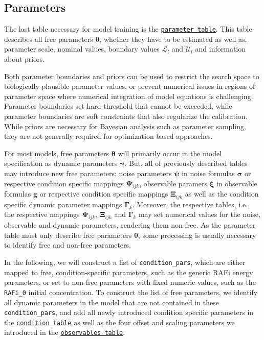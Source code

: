 \documentclass[11pt]{article}
\begin{document}
    \hypertarget{parameters}{%
\subsection{Parameters}\label{parameters}}

The last table necessary for model training is the
\href{https://petab.readthedocs.io/en/latest/documentation_data_format.html\#parameter-table}{\texttt{parameter\ table}}.
This table describes all free parameters \(\boldsymbol{\theta}\),
whether they have to be estimated as well as, parameter scale, nominal
values, boundary values \(\mathcal{L}_l\) and \(\mathcal{U}_l\) and
information about priors.

Both parameter boundaries and priors can be used to restrict the search
space to biologically plausible parameter values, or prevent numerical
issues in regions of parameter space where numerical integration of
model equations is challenging. Parameter boundaries set hard threshold
that cannot be exceeded, while parameter boundaries are soft constraints
that also regularize the calibration. While priors are necessary for
Bayesian analysis such as parameter sampling, they are not generally
required for optimization based approaches.

For most models, free parameters \(\boldsymbol{\theta}\) will primarily
occur in the model specification as dynamic parameters
\(\boldsymbol{\gamma}\). But, all of previously described tables may
introduce new free parameters: noise parameters \(\boldsymbol{\psi}\) in
noise formulas \(\boldsymbol{\sigma}\) or respective condition specific
mappings \(\boldsymbol{\Psi}_{ijk}\), observable paramers
\(\boldsymbol{\xi}\) in observable formulas \(\boldsymbol{g}\) or
respective condition specific mappings \(\boldsymbol{\Xi}_{ijk}\) as
well as the condition specific dynamic parameter mappings
\(\boldsymbol{\Gamma}_{k}\). Moreover, the respective tables, i.e., the
respective mappings \(\boldsymbol{\Psi}_{ijk}\),
\(\boldsymbol{\Xi}_{ijk}\) and \(\boldsymbol{\Gamma}_{k}\) may set
numerical values for the noise, observable and dynamic parameters,
rendering them non-free. As the parameter table must only describe free
parameters \(\boldsymbol{\theta}\), some processing is usually necessary
to identify free and non-free parameters.

In the following, we will construct a list of \texttt{condition\_pars},
which are either mapped to free, condition-specific parameters, such as
the generic RAFi energy parameters, or set to non-free parameters with
fixed numeric values, such as the \texttt{RAFi\_0} initial
concentration. To construct the list of free parameters, we identify all
dynamic parameters in the model that are not contained in these
\texttt{condition\_pars}, and add all newly introduced condition
specific parameters in the
\href{https://petab.readthedocs.io/en/latest/documentation_data_format.html\#condition-table}{\texttt{condition\ table}}
as well as the four offset and scaling parameters we introduced in the
\href{https://petab.readthedocs.io/en/latest/documentation_data_format.html\#observables-table}{\texttt{observables\ table}}.
\end{document}
